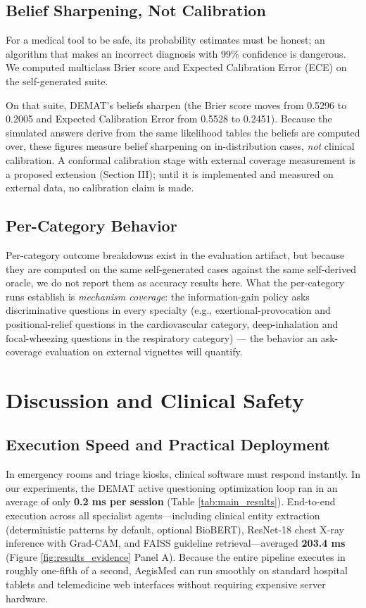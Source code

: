 \documentclass[10pt,twocolumn]{article}
\begin{document}
\subsection{Belief Sharpening, Not Calibration}
For a medical tool to be safe, its probability estimates must be honest; an algorithm that makes an incorrect diagnosis with 99\% confidence is dangerous. We computed multiclass Brier score \cite{brier1950verification} and Expected Calibration Error (ECE) on the self-generated suite.

On that suite, DEMAT's beliefs sharpen (the Brier score moves from 0.5296 to 0.2005 and Expected Calibration Error from 0.5528 to 0.2451). Because the simulated answers derive from the same likelihood tables the beliefs are computed over, these figures measure belief sharpening on in-distribution cases, \emph{not} clinical calibration. A conformal calibration stage with external coverage measurement is a proposed extension (Section III); until it is implemented and measured on external data, no calibration claim is made.

\subsection{Per-Category Behavior}
Per-category outcome breakdowns exist in the evaluation artifact, but because they are computed on the same self-generated cases against the same self-derived oracle, we do not report them as accuracy results here. What the per-category runs establish is \emph{mechanism coverage}: the information-gain policy asks discriminative questions in every specialty (e.g., exertional-provocation and positional-relief questions in the cardiovascular category, deep-inhalation and focal-wheezing questions in the respiratory category) --- the behavior an ask-coverage evaluation on external vignettes will quantify.

\section{Discussion and Clinical Safety}

\subsection{Execution Speed and Practical Deployment}
In emergency rooms and triage kiosks, clinical software must respond instantly. In our experiments, the DEMAT active questioning optimization loop ran in an average of only \textbf{0.2 ms per session} (Table \ref{tab:main_results}). End-to-end execution across all specialist agents---including clinical entity extraction (deterministic patterns by default, optional BioBERT), ResNet-18 chest X-ray inference with Grad-CAM, and FAISS guideline retrieval---averaged \textbf{203.4 ms} (Figure \ref{fig:results_evidence} Panel A). Because the entire pipeline executes in roughly one-fifth of a second, AegisMed can run smoothly on standard hospital tablets and telemedicine web interfaces without requiring expensive server hardware.
\end{document}
